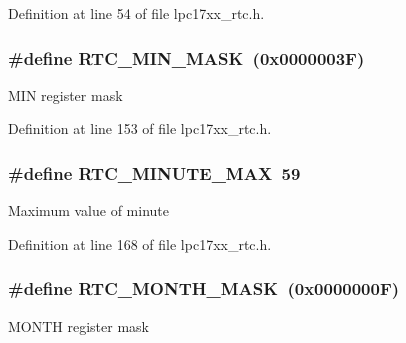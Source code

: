 \-Definition at line 54 of file lpc17xx\-\_\-rtc.\-h.

\hypertarget{group___r_t_c___private___macros_ga9f3224adad8ed73109ee0309c3580998}{
\subsubsection[{\-R\-T\-C\-\_\-\-M\-I\-N\-\_\-\-M\-A\-S\-K}]{\setlength{\rightskip}{0pt plus 5cm}\#define {\bf \-R\-T\-C\-\_\-\-M\-I\-N\-\_\-\-M\-A\-S\-K}~(0x0000003\-F)}}\label{group___r_t_c___private___macros_ga9f3224adad8ed73109ee0309c3580998}
\-M\-I\-N register mask 

\-Definition at line 153 of file lpc17xx\-\_\-rtc.\-h.

\hypertarget{group___r_t_c___private___macros_gab55b557eeb5c66e94a2fda3638e3b7ee}{
\subsubsection[{\-R\-T\-C\-\_\-\-M\-I\-N\-U\-T\-E\-\_\-\-M\-A\-X}]{\setlength{\rightskip}{0pt plus 5cm}\#define {\bf \-R\-T\-C\-\_\-\-M\-I\-N\-U\-T\-E\-\_\-\-M\-A\-X}~59}}\label{group___r_t_c___private___macros_gab55b557eeb5c66e94a2fda3638e3b7ee}
\-Maximum value of minute 

\-Definition at line 168 of file lpc17xx\-\_\-rtc.\-h.

\hypertarget{group___r_t_c___private___macros_ga491df15fba29dd3237f7bd59a9338050}{
\subsubsection[{\-R\-T\-C\-\_\-\-M\-O\-N\-T\-H\-\_\-\-M\-A\-S\-K}]{\setlength{\rightskip}{0pt plus 5cm}\#define {\bf \-R\-T\-C\-\_\-\-M\-O\-N\-T\-H\-\_\-\-M\-A\-S\-K}~(0x0000000\-F)}}\label{group___r_t_c___private___macros_ga491df15fba29dd3237f7bd59a9338050}
\-M\-O\-N\-T\-H register mask 

